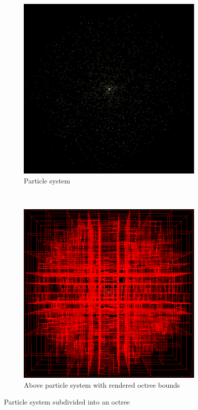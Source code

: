 
\begin{figure}[!h]
    \centering
    \begin{subfigure}[b]{0.65\textwidth}
        \includegraphics[width=\textwidth]{Method/Figs/PSNoBounds.png}
        \caption{Particle system}
    \end{subfigure}
    ~ 
    \begin{subfigure}[b]{0.65\textwidth}
        \includegraphics[width=\textwidth]{Method/Figs/PSWithBounds.png}
        \caption{Above particle system with rendered octree bounds}
    \end{subfigure}
    \caption{Particle system subdivided into an octree}
    \label{fig:OctreeVisualized}
\end{figure}


